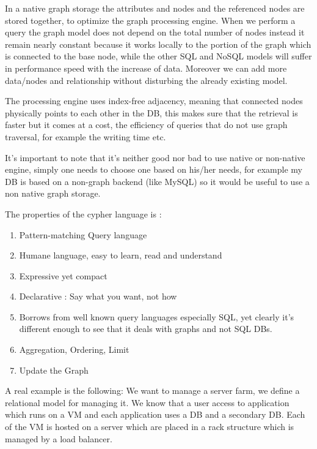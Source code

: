 \documentclass[a4page, 11pt]{article}
\begin{document}
In a native graph storage the attributes and nodes and the referenced nodes are stored together, to optimize the graph processing engine. 
When we perform a query the graph model does not depend on the total number of nodes instead it remain nearly constant because it works locally to the portion of the graph which is connected to the base node, while the other SQL and NoSQL models will suffer in performance speed with the
increase of data. Moreover we can add more data/nodes and relationship without disturbing the already existing model.

The processing engine uses index-free adjacency, meaning that connected nodes physically points to each other in the DB, this makes sure that the retrieval is faster but it comes at a cost, the efficiency of queries that do not use graph traversal, for example the writing time etc.

It's important to note that it's neither good nor bad to use native or non-native engine, simply one needs to choose one based on his/her needs, for example my DB is based on a non-graph backend (like MySQL) so it would be useful to use a non native graph storage.

The properties of the cypher language is :

\begin{enumerate}[noitemsep]
	 
	\item
	Pattern-matching Query language
	\item
	Humane language, easy to learn, read and understand
	\item
	Expressive yet compact
	\item
	Declarative : Say what you want, not how
	\item
	Borrows from well known query languages especially SQL, yet clearly it's different enough to see that it deals with graphs and not SQL	DBs.
	\item
	Aggregation, Ordering, Limit
	\item
	Update the Graph
\end{enumerate}

A real example is the following: We want to manage a server farm, we define a relational model for managing it. 
We know that a user access to application which runs on a VM and each application uses a DB and a secondary DB. 
Each of the VM is hosted on a server which are placed in a rack structure which is managed by a load balancer.
\end{document}
